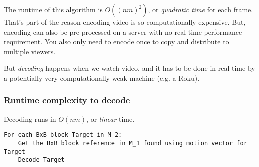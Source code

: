 \documentclass[titlepage, 12pt, leqno]{article}
\begin{document}
The runtime of this algorithm is $O((nm)^{2})$, or \textit{quadratic time} 
for each frame. That's part of the reason encoding video is so computationally
expensive. But, encoding can also be pre-processed on a server with no real-time
performance requirement. You also only need to encode once to copy and 
distribute to multiple viewers.

But \textit{decoding} happens when we watch video, and it has to be done in 
real-time by a potentially very computationally weak machine (e.g. a Roku).

\subsubsection{Runtime complexity to decode}
Decoding runs in $O(nm)$, or \textit{linear} time.
\begin{verbatim}
For each BxB block Target in M_2:
    Get the BxB block reference in M_1 found using motion vector for Target
    Decode Target
\end{verbatim}
\end{document}
